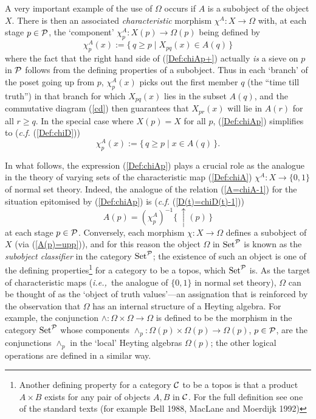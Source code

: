 \documentclass[12pt]{article}
\newcounter{def-number}[section]
\newcommand{\beq}{\begin{equation}}
\newcommand{\eeq}{\end{equation}}
\newcommand{\eq}[1]{(\ref{#1})}
\newcommand{\ie}{{\em i.e.,\ }}
\newcommand{\map}{\rightarrow}
\newcommand{\up}[1]{\uparrow\!\!(#1)}
\newcommand{\Om}{\Omega}
\newcommand{\Set}{{\rm Set}}
\begin{document}
	A very important example of the use of $\Om$ occurs if $A$ is a
subobject of the object $X$.  There is then an associated {\em
characteristic\/} morphism $\chi^A:X\map\Om$ with, at each stage
$p\in\cal P$, the `component' $\chi^A_p:X(p)\map\Om(p)$ being
defined by
\beq
	\chi^A_p(x):=\{\,q\geq p\mid X_{pq}(x)\in A(q)\,\}\label{Def:chiAp+}
\eeq
where the fact that the right hand side of \eq{Def:chiAp+} actually
{\em is\/} a sieve on $p$ in $\cal P$ follows from the defining
properties of a subobject. Thus in each `branch' of the poset going
up from $p$, $\chi^A_p(x)$ picks out the first member $q$ (the
``time till truth'') in that branch for which $X_{pq}(x)$ lies in
the subset $A(q)$, and the commutative diagram \eq{cd} then
guarantees that $X_{pr}(x)$ will lie in $A(r)$ for all $r\geq q$. In
the special case where $X(p)=X$ for all $p$,
\eq{Def:chiAp} simplifies to ({\em c.f.} \eq{Def:chiD})
\beq
	\chi^A_p(x):=\{\,q\geq p\mid x\in A(q)\,\}\label{Def:chiAp}.
\eeq

	In what follows, the expression \eq{Def:chiAp} plays a crucial
role as the analogue in the theory of varying sets of the
characteristic map \eq{Def:chiA} $\chi^A:X\map\{0,1\}$ of normal set
theory.  Indeed, the analogue of the relation \eq{A=chiA-1} for the
situation epitomised by \eq{Def:chiAp} is ({\em c.f.}
\eq{D(t)=chiD(t)-1})
\beq
		A(p)=(\chi^A_p)^{-1}\{\,\up{p}\,\}			\label{A(p)=upp}
\eeq
at each stage $p\in\cal P$. Conversely, each morphism
$\chi:X\map\Om$ defines a subobject of $X$ (via
\eq{A(p)=upp}), and for this reason the object $\Om$ in $\Set^{\cal
P}$ is known as the {\em subobject classifier\/} in the category
$\Set^{\cal P}$; the existence of such an object is one of the
defining properties\footnote{Another defining property for a
category $\cal C$ to be a topos is that a product $A\times B$ exists
for any pair of objects $A,B$ in $\cal C$. For the full definition
see one of the standard texts (for example Bell 1988, MacLane and
Moerdijk 1992)} for a category to be a topos, which $\Set^{\cal P}$
is. As the target of characteristic maps (\ie the analogue of
$\{0,1\}$ in normal set theory), $\Omega$ can be thought of as the
`object of truth values'---an assignation that is reinforced by the
observation that $\Omega$ has an internal structure of a Heyting
algebra. For example, the conjunction $\land:\Om\times\Om\map\Om$ is
defined to be the morphism in the category $\Set^{\cal P}$ whose
components $\land_p:\Om(p)\times\Om(p)\map\Om(p)$, $p\in\cal P$, are
the conjunctions $\land_p$ in the `local' Heyting algebras $\Om(p)$;
the other logical operations are defined in a similar way.
\end{document}
